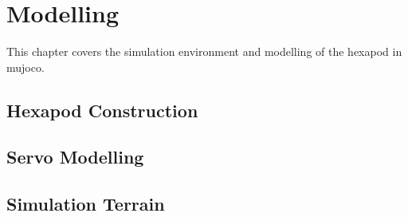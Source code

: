 \chapter{Modelling}
This chapter covers the simulation environment and modelling of the hexapod in \ac{mujoco}.

\section{Hexapod Construction}
\section{Servo Modelling}
\section{Simulation Terrain}